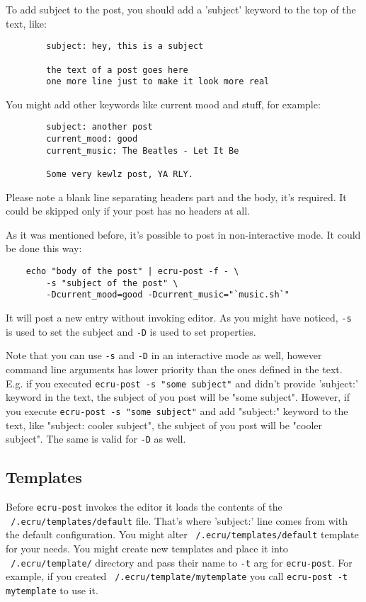\documentclass{article}
\begin{document}
	To add subject to the post, you should add a 'subject' keyword to the top of the text, like:
	\begin{verbatim}
		subject: hey, this is a subject

		the text of a post goes here
		one more line just to make it look more real
    	\end{verbatim}

	You might add other keywords like current mood and stuff, for example:
	
	\begin{verbatim}
		subject: another post
		current_mood: good
		current_music: The Beatles - Let It Be
	
		Some very kewlz post, YA RLY.
	\end{verbatim}

	Please note a blank line separating headers part and the body, it's required. It could be skipped
	only if your post has no headers at all.

	As it was mentioned before, it's possible to post in non-interactive mode. It could be done this way:
	
	\begin{verbatim}
	echo "body of the post" | ecru-post -f - \
		-s "subject of the post" \
		-Dcurrent_mood=good -Dcurrent_music="`music.sh`"
	\end{verbatim}

	It will post a new entry without invoking editor. As you might have noticed, {\tt -s } is used to set the subject
	and {\tt -D} is used to set properties. 

	Note that you can use {\tt -s} and {\tt -D} in an interactive mode as well, however command line arguments has
	lower priority than the ones defined in the text. E.g. if you executed {\tt ecru-post -s "some subject"} and
	didn't provide 'subject:' keyword in the text, the subject of you post will be "some subject". However, if
	you execute {\tt ecru-post -s "some subject"} and add "subject:" keyword to the text, like "subject: cooler
	subject", the subject of you post will be "cooler subject". The same is valid for {\tt -D} as well.

	\subsection{Templates}
	Before {\tt ecru-post} invokes the editor it loads the contents of the {\tt ~/.ecru/templates/default} file. 
	That's where 'subject:' line comes from with the default configuration. You might alter 
	{\tt ~/.ecru/templates/default} template for your needs. You might create new templates and place it into
	{\tt ~/.ecru/template/} directory and pass their name to {\tt -t} arg for {\tt ecru-post}. For example,
	if you created {\tt ~/.ecru/template/mytemplate} you call {\tt ecru-post -t mytemplate} to use it.
\end{document}
